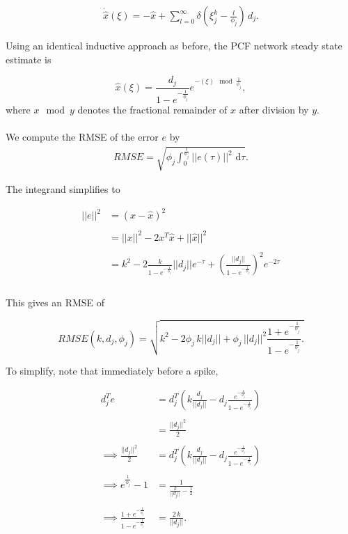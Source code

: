 \begin{align*}
\dot{\hat{x}}(\xi) = - \hat{x} + \sum_{l=0}^{\infty} \delta \left(\xi_j^k - \frac{l}{\phi_j}\right) \, d_j .
\end{align*}

Using an identical inductive approach as before, the PCF network steady state estimate is 

\begin{equation}
\label{eq:analysis:pcf_gj_const_driving:estimate_explicit_phi}
\hat{x}(\xi) =
\frac{d_j}{1 - e^{-\frac{1}{\phi_j}}} e^{- (\xi) \mod{\frac{1}{\phi_j}}},
\end{equation} 
where $x \mod{y}$ denotes the fractional remainder of $x$ after division by $y$. 
\\
\\
We compute the  RMSE of the error $e$ by 
\begin{align*}
RMSE = \sqrt{\phi_j \int_{0}^{\frac{1}{\phi_j}} \!  ||e(\tau)||^2 \, \, \mathrm{d}\tau}.
\end{align*}

The integrand simplifies to 

\begin{align*}
||e||^2  &= (x - \hat{x})^2 
\\
\\
&= ||x||^2 - 2 x^T\hat{x} + ||\hat{x}||^2
\\
\\
&= 
k^2 - 2\frac{k}{1 - e^{-\frac{1}{\phi_j}}} ||d_j|| e^{-\tau} + \left(\frac{||d_j||}{1 - e^{-\frac{1}{\phi_j}}}\right)^2 e^{-2\tau}
\\
\\
\end{align*}

This gives an RMSE of 

$$
RMSE(k, d_j, \phi_j) = 
\sqrt{
k^2 - 2 \phi_j \, k ||d_j|| +\phi_j \, ||d_j||^2 \frac{1 + e^{-\frac{1}{\phi_j}}}{1 - e^{-\frac{1}{\phi_j}}}.
}
$$

To simplify, note that immediately before a spike, 

\begin{align*}
d_j^T e &= d_j^T \left(k \frac{d_j}{||d_j||}  - d_j \frac{e^{-\frac{1}{\phi_j}}}{1 - e^{-\frac{1}{\phi_j}}}\right) 
\\
\\
&= \frac{||d_j||^2}{2}
\\
\\
\implies
 \frac{||d_j||^2}{2} &= d_j^T \left(k \frac{d_j}{||d_j||}  - d_j \frac{e^{-\frac{1}{\phi_j}}}{1 - e^{-\frac{1}{\phi_j}}}\right)
\\
\\
\implies 
e^{\frac{1}{\phi_j}} - 1 &= \frac{1}{\frac{k}{||d_j||} - \frac{1}{2}} 
\\
\\
\implies
\frac{{1 + e^{-\frac{1}{\phi_j}}}}{{1 - e^{-\frac{1}{\phi_j}}}} 
&=
\frac{2 \, k}{||d_j||}.
\end{align*}

